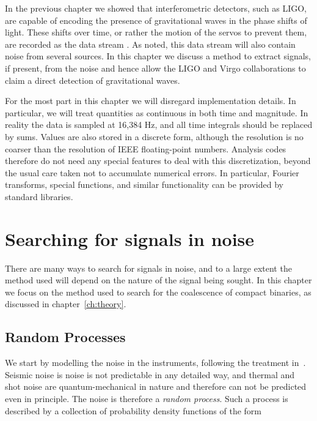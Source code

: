 In the previous chapter we showed that interferometric detectors, such
as LIGO, are capable of encoding the presence of gravitational waves
in the phase shifts of light.  These shifts over time, or rather the
motion of the servos to prevent them, are recorded as the data stream
\darmerr.  As noted, this data stream will also contain noise from
several sources.  In this chapter we discuss a method to extract
signals, if present, from the noise and hence allow the LIGO and Virgo
collaborations to claim a direct detection of gravitational waves.

For the most part in this chapter we will disregard implementation
details.  In particular, we will treat quantities as continuous in
both time and magnitude.  In reality the data is sampled at 16,384 
Hz, and all time integrals should be replaced by sums.  Values are
also stored in a discrete form, although the resolution is no coarser
than the resolution of IEEE floating-point numbers.  Analysis codes
therefore do not need any special features to deal with this
discretization, beyond the usual care taken not to accumulate
numerical errors.  In particular, Fourier transforms, special
functions, and similar functionality can be provided by standard
libraries.



\section{Searching for signals in noise}
\label{sec:ihope_match_filter}

There are many ways to search for signals in noise, and to a large
extent the method used will depend on the nature of the signal being
sought.  In this chapter we focus on the method used to search for the
coalescence of compact binaries, as discussed in
chapter~\ref{ch:theory}.

\subsection{Random Processes}
\label{ssec:random_processes}

We start by modelling the noise in the instruments, following the
treatment in~\cite{BlandfordThorne}.  Seismic noise is noise is not
predictable in any detailed way, and thermal and shot noise are
quantum-mechanical in nature and therefore can not be predicted even
in principle.  The noise is therefore a \emph{random process}.  Such a
process is described by a collection of probability density functions
of the form

